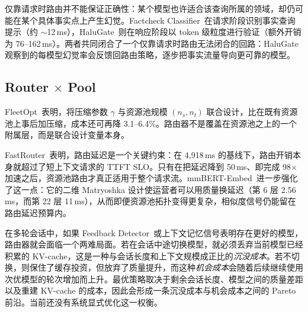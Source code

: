 \begin{observation}[事实型工作负载需要响应时验证]
\label{obs:wr-halu}
仅靠请求时路由并不能保证正确性：某个模型也许适合该查询所属的领域，却仍可能在某个具体事实点上产生幻觉。Factcheck Classifier~\cite{factcheck2026}在请求阶段识别事实查询提示（约 $\sim$12\,ms），HaluGate~\cite{halugate2025}则在响应阶段以 token 级粒度进行验证（额外开销为 76--162\,ms）。两者共同闭合了一个仅靠请求时路由无法闭合的回路：HaluGate 观察到的每模型幻觉率会反馈回路由策略，逐步把事实流量导向更可靠的模型。
\end{observation}

\subsection{Router $\times$ Pool}
\label{sec:cross:rp}

\begin{observation}[路由策略共同决定资源池规模]
\label{obs:rp-codesign}
FleetOpt~\cite{fleetopt2026}表明，将压缩参数 $\gamma$ 与资源池规模 $(n_s, n_l)$ 联合设计，比在既有资源池上事后加压缩，成本还可再降 3.1--6.4\%。路由器不是覆盖在资源池之上的一个附属层，而是联合设计变量本身。
\end{observation}

\begin{observation}[路由延迟约束资源池拓扑]
\label{obs:rp-latency}
FastRouter~\cite{fastrouter2026}表明，路由延迟是一个关键约束：在 4,918\,ms 的基线下，路由开销本身就超过了短上下文请求的 TTFT SLO。只有在把延迟降到 50\,ms、即完成 98$\times$ 加速之后，资源池路由才真正适用于整个请求流。mmBERT-Embed~\cite{mmberted2025}进一步强化了这一点：它的二维 Matryoshka 设计使运营者可以用质量换延迟（第 6 层 2.56\,ms，而第 22 层 11\,ms），从而即便资源池拓扑变得更复杂，相似度信号仍能留在路由延迟预算内。
\end{observation}

\begin{observation}
\label{obs:rp-sunkcost}
在多轮会话中，如果 Feedback Detector~\cite{feedbackdet2026}或上下文记忆信号表明存在更好的模型，路由器就会面临一个两难局面。若在会话中途切换模型，就必须丢弃当前模型已经积累的 KV-cache，这是一种与会话长度和上下文规模成正比的\emph{沉没成本}。若不切换，则保住了缓存投资，但放弃了质量提升，而这种\emph{机会成本}会随着后续继续使用次优模型的轮次增加而上升。最优策略取决于剩余会话长度、模型之间的质量差距以及重建 KV-cache 的成本，因此会形成一条沉没成本与机会成本之间的 Pareto 前沿。当前还没有系统显式优化这一权衡。
\end{observation}


